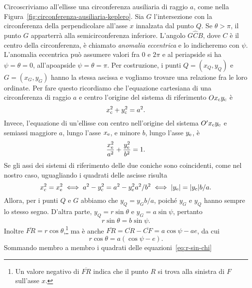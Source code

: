 Circoscriviamo all'ellisse una circonferenza ausiliaria di raggio $a$, come
nella Figura~\ref{fig:circonferenza-ausiliaria-keplero}. Sia $G$ l'intersezione
con la circonferenza della perpendicolare all'asse $x$ innalzata dal punto
$Q$. Se $\theta > \pi$, il punto $G$ apparterrà alla semicirconferenza
inferiore. L'angolo $G\widehat{C}B$, dove $C$ è il centro della circonferenza, è
chiamato \emph{anomalia eccentrica} e lo indicheremo con $\psi$. L'anomalia
eccentrica può assumere valori fra $0$ e $2\pi$ e al periapside si ha
$\psi = \theta = 0$, all'apoapside $\psi = \theta = \pi$. Per costruzione, i
punti $Q=(x_Q,y_Q)$ e $G=(x_G,y_G)$ hanno la stessa ascissa e vogliamo trovare
una relazione fra le loro ordinate. Per fare questo ricordiamo che l'equazione
cartesiana di una circonferenza di raggio $a$ e centro l'origine del sistema di
riferimento $Ox_\textup{c}y_\textup{c}$ è
\begin{equation}
  x_\textup{c}^2 + y_\textup{c}^2 = a^2.
\end{equation}
Invece, l'equazione di un'ellisse con centro nell'origine del sistema
$O'x_\textup{e}y_\textup{e}$ e semiassi maggiore $a$, lungo l'asse
$x_\textup{e}$, e minore $b$, lungo l'asse $y_\textup{e}$, è
\begin{equation}
    \frac{x_\textup{e}^2}{a^2} + \frac{y_\textup{e}^2}{b^2} = 1.
\end{equation}
Se gli assi dei sistemi di riferimento delle due coniche sono coincidenti, come
nel nostro caso, uguagliando i quadrati delle ascisse risulta
\begin{equation}
  x_\textup{c}^2 = x_\textup{e}^2 \iff a^2 - y_\textup{c}^2 = a^2 -
  y_\textup{e}^2a^2/b^2 \iff \lvert y_\textup{e}\rvert = \lvert y_\textup{c}\rvert b/a.
\end{equation}
Allora, per i punti $Q$ e $G$ abbiamo che $y_Q = y_Gb/a$, poiché $y_G$ e $y_Q$
hanno sempre lo stesso segno. D'altra parte, $y_Q = r\sin\theta$ e
$y_G = a\sin\psi$, pertanto
\begin{equation}
  \label{eq:r-sin-chi}
  r\sin\theta = b\sin\psi.
\end{equation}
Inoltre $\overline{FR} =
r\cos\theta$,\footnote{Un
  valore negativo di $\overline{FR}$ indica che il punto $R$ si trova alla
  sinistra di $F$ sull'asse $x$.} ma è anche $\overline{FR} = \overline{CR} -
\overline{CF} = a\cos\psi - ae$, da cui
\begin{equation}
  \label{eq:r-cos-chi}
  r\cos\theta = a(\cos\psi - e).
\end{equation}
Sommando membro a membro i quadrati delle equazioni~\eqref{eq:r-sin-chi}
